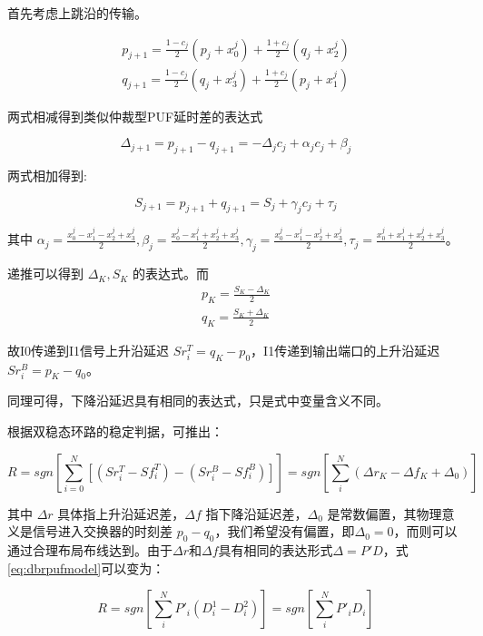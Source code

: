 首先考虑上跳沿的传输。

\begin{eqnarray}
p_{j+1}=\frac{1-c_j}{2}(p_j+x_0^j)+\frac{1+c_j}{2}(q_j+x_2^j) \\
q_{j+1}=\frac{1-c_j}{2}(q_j+x_3^j)+\frac{1+c_j}{2}(p_j+x_1^j)
\end{eqnarray}

两式相减得到类似仲裁型PUF延时差的表达式

\begin{equation}
\Delta_{j+1}=p_{j+1}-q_{j+1}=-\Delta_jc_j+\alpha_jc_j+\beta_j
\end{equation}

两式相加得到:

\begin{equation}
S_{j+1}=p_{j+1}+q_{j+1}=S_j+\gamma_jc_j+\tau_j
\end{equation}

其中 $ \alpha_j=\frac{x_0^j-x_1^j-x_2^j+x_3^j}{2},\beta_j=\frac{x_0^j-x_1^j+x_2^j+x_3^j}{2},\gamma_j=\frac{x_0^j-x_1^j-x_2^j+x_3^j}{2},\tau_j=\frac{x_0^j+x_1^j+x_2^j+x_3^j}{2} $。

递推可以得到 $ \Delta_K, S_K $ 的表达式。而
\begin{eqnarray}
p_K=\frac{S_K-\Delta_K}{2} \\
q_K=\frac{S_K+\Delta_K}{2}
\end{eqnarray}

故I0传递到I1信号上升沿延迟 $ Sr_i^T=q_K-p_0 $，I1传递到输出端口的上升沿延迟 $ Sr_i^B=p_K-q_0 $。

同理可得，下降沿延迟具有相同的表达式，只是式中变量含义不同。

根据双稳态环路的稳定判据，可推出：

\begin{equation}\label{eq:dbrpufmodel}
R=sgn[\sum\limits_{i=0}^{N}[(Sr_i^T-Sf_i^T)-(Sr_i^B-Sf_i^B)]]=sgn[\sum\limits_{i}^{N}(\Delta r_K-\Delta f_K+\Delta_0)]
\end{equation}

其中 $ \Delta r $ 具体指上升沿延迟差，$ \Delta f $ 指下降沿延迟差，$ \Delta_0 $ 是常数偏置，其物理意义是信号进入交换器的时刻差 $ p_0-q_0 $，我们希望没有偏置，即$ \Delta_0=0 $，而则可以通过合理布局布线达到。由于$ \Delta r $和$ \Delta f $具有相同的表达形式$ \Delta=P'D $，式\ref{eq:dbrpufmodel}可以变为：

\begin{equation}
R=sgn[\sum\limits_{i}^{N}P'_i(D_i^1-D_i^2)]=sgn[\sum\limits_{i}^{N}P'_iD_i]
\end{equation}

